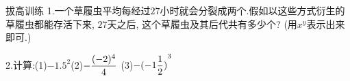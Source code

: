 \documentclass{beamer}
\begin{document}
\begin{frame}{拔高训练}\large
  1.一个草履虫平均每经过$27$小时就会分裂成两个.假如以这些方式衍生的草履虫都能存活下来, $27$天之后, 这个草履虫及其后代共有多少个? (用$x^y$表示出来即可.)

  2.计算:(1)$-1.5^2$\qquad (2)$\displaystyle -\frac{(-2)^4}{4}$ \qquad (3)$\displaystyle -{(-1\frac12)}^3$

\end{frame}
\end{document}
